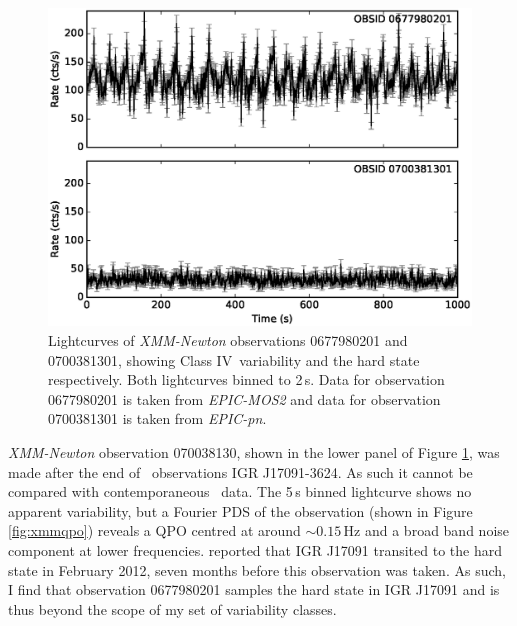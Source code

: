 \begin{figure}
    \includegraphics[width=0.8\columnwidth, trim = 0.6cm 0 3.9cm 0]{images/xmmlc.eps}
    \captionsetup{singlelinecheck=off}
    \caption[\textit{XMM-Newton} lightcurves showing an example of Class IV variability and the hard state.]{Lightcurves of \indexxmm\textit{XMM-Newton} observations 0677980201 and 0700381301, showing Class IV\indexiv\ variability and the hard state respectively.  Both lightcurves binned to 2\,s.  Data for observation 0677980201 is taken from \indexepic\textit{EPIC-MOS2} and data for observation 0700381301 is taken from \textit{EPIC-pn}.}
   \label{fig:XMM}
\end{figure}

\par \indexxmm\textit{XMM-Newton} observation 070038130, shown in the lower panel of Figure \ref{fig:XMM}, was made after the end of \indexrxte\rxte\ observations IGR J17091-3624.  As such it cannot be compared with contemporaneous \rxte\ data.  The 5\,s binned lightcurve shows no apparent variability, but a Fourier PDS of the observation (shown in Figure \ref{fig:xmmqpo}) reveals a QPO centred at around $\sim0.15$\,Hz and a broad band noise component at lower frequencies.  \citet{Drave_Return} reported that IGR J17091 transited to the hard state in February 2012, seven months before this observation was taken.  As such, I find that observation 0677980201 samples the hard state in IGR J17091 and is thus beyond the scope of my set of variability classes.

